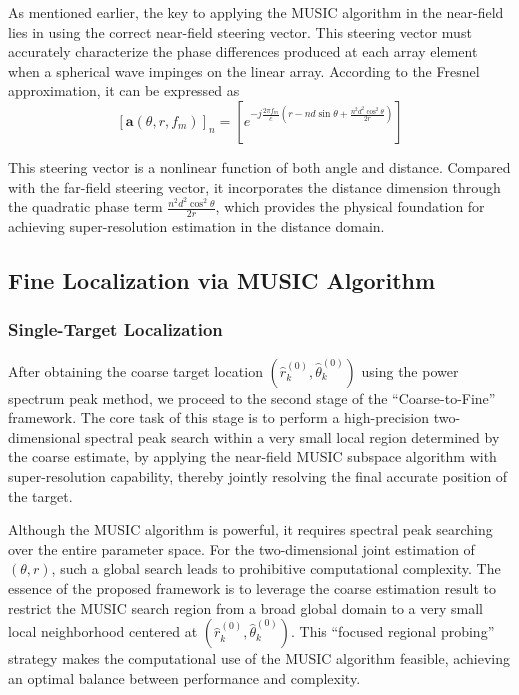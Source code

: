 \documentclass[lettersize,journal]{IEEEtran}
\begin{document}
As mentioned earlier, the key to applying the MUSIC algorithm in the near-field lies in using the correct near-field steering vector. This steering vector must accurately characterize the phase differences produced at each array element when a spherical wave impinges on the linear array. According to the Fresnel approximation, it can be expressed as
	\begin{equation}
		\left[\mathbf{a}(\theta,r,f_{m})\right]_n = \left[e^{-j\frac{2\pi f_{m}}{c}\left(r-nd\sin\theta+\frac{n^{2}d^{2}\cos^{2}\theta}{2r}\right)}\right]
	\end{equation}

This steering vector is a nonlinear function of both angle and distance. Compared with the far-field steering vector, it incorporates the distance dimension through the quadratic phase term $\tfrac{n^2 d^2 \cos^2\theta}{2r}$, which provides the physical foundation for achieving super-resolution estimation in the distance domain.

\subsection{Fine Localization via MUSIC Algorithm}

\subsubsection{Single-Target Localization}
After obtaining the coarse target location $(\hat{r}_{k}^{(0)}, \hat{\theta}_{k}^{(0)})$ using the power spectrum peak method, we proceed to the second stage of the “Coarse-to-Fine” framework. The core task of this stage is to perform a high-precision two-dimensional spectral peak search within a very small local region determined by the coarse estimate, by applying the near-field MUSIC  subspace algorithm with super-resolution capability, thereby jointly resolving the final accurate position of the target.

Although the MUSIC algorithm is powerful, it requires spectral peak searching over the entire parameter space. For the two-dimensional joint estimation of $(\theta, r)$, such a global search leads to prohibitive computational complexity. The essence of the proposed framework is to leverage the coarse estimation result to restrict the MUSIC search region from a broad global domain to a very small local neighborhood centered at $(\hat{r}_{k}^{(0)}, \hat{\theta}_{k}^{(0)})$. This “focused regional probing” strategy makes the computational use of the MUSIC algorithm feasible, achieving an optimal balance between performance and complexity.
\end{document}
